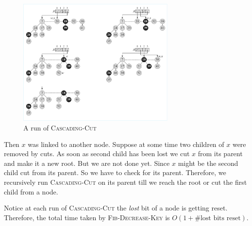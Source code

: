 \begin{figure}[h!]
	\centering
	\includegraphics[width=0.7\textwidth]{images/Fibheap3.pdf}
	\caption{A run of \textsc{Cascading-Cut}}
\end{figure}Then $x$ was linked to another node. Suppose at some time two children of $x$ were removed by cuts. As soon as second child has been lost we cut $x$ from its parent and make it a new root. But we are not done yet. Since $x$ might be the second child cut from its parent. So we have to check for its parent. Therefore, we recursively run \textsc{Cascading-Cut} on its parent till we reach the root or cut the first child from a node.

Notice at each run of \textsc{Cascading-Cut} the \emph{lost} bit of a node is getting reset. Therefore, the total time taken by \textsc{Fib-Decrease-Key} is $O(1+\#\text{lost bits reset})$.
